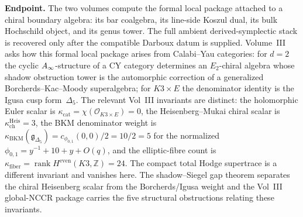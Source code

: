\medskip\noindent\textbf{Endpoint.}\enspace
The two volumes compute the formal local package attached to a chiral
boundary algebra: its bar coalgebra, its line-side Koszul dual, its
bulk Hochschild object, and its genus tower. The full ambient
derived-symplectic stack is recovered only after the compatible
Darboux datum is supplied. Volume~III asks how this formal local
package arises from Calabi--Yau categories: for $d = 2$ the cyclic
$A_\infty$-structure of
a CY category determines an $E_2$-chiral algebra whose shadow
obstruction tower is the automorphic correction of a generalized
Borcherds--Kac--Moody superalgebra; for $K3 \times E$ the
denominator identity is the Igusa cusp form~$\Delta_5$. The relevant
Vol~III invariants are distinct: the holomorphic Euler scalar is
$\kappa_{\mathrm{cat}}=\chi(\mathcal O_{K3\times E})=0$, the
Heisenberg--Mukai chiral scalar is
$\kappa_{\mathrm{ch}}^{\mathrm{Heis}}=3$, the BKM denominator weight is
$\kappa_{\mathrm{BKM}}(\mathfrak g_{\Delta_5})
=c_{\phi_{0,1}}(0,0)/2=10/2=5$ for the normalized
$\phi_{0,1}=y^{-1}+10+y+O(q)$, and the elliptic-fibre count is
$\kappa_{\mathrm{fiber}}=\operatorname{rank}H^{\mathrm{even}}(K3,\mathbb Z)=24$.
The compact total Hodge supertrace is a different invariant and
vanishes here. The shadow--Siegel gap theorem separates
the chiral Heisenberg scalar from the Borcherds/Igusa weight and the
Vol~III global-NCCR package carries the five structural obstructions
relating these invariants.
